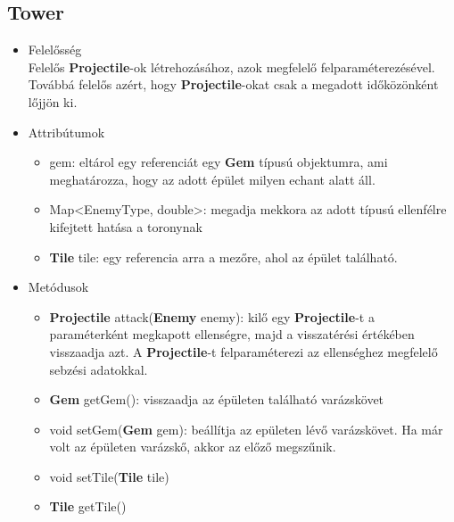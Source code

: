 \subsection{Tower}
\begin{itemize}
\item Felelősség\\
Felelős \textbf{Projectile}-ok létrehozásához, azok megfelelő felparaméterezésével. Továbbá felelős azért, hogy \textbf{Projectile}-okat csak a megadott időközönként lőjjön ki.
\item Attribútumok
	\begin{itemize}
		\item gem: eltárol egy referenciát egy \textbf{Gem} típusú objektumra, ami meghatározza, hogy az adott épület milyen echant alatt áll.
		\item Map<EnemyType, double>: megadja mekkora az adott típusú ellenfélre kifejtett hatása a toronynak
		\item \textbf{Tile} tile: egy referencia arra a mezőre, ahol az épület található.
	\end{itemize}
\item Metódusok
	\begin{itemize}
		\item \textbf{Projectile} attack(\textbf{Enemy} enemy): kilő egy \textbf{Projectile}-t a paraméterként megkapott ellenségre, majd a visszatérési értékében visszaadja azt. A \textbf{Projectile}-t felparaméterezi az ellenséghez megfelelő sebzési adatokkal.
		\item \textbf{Gem} getGem(): visszaadja az épületen található varázskövet
		\item void setGem(\textbf{Gem} gem): beállítja az epületen lévő varázskövet. Ha már volt az épületen varázskő, akkor az előző megszűnik.
		\item void setTile(\textbf{Tile} tile)
		\item \textbf{Tile} getTile()
	\end{itemize}
\end{itemize}


